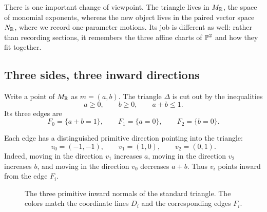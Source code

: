 There is one important change of viewpoint. The triangle lives in
\(M_{\mathbb{R}}\), the space of monomial exponents, whereas the new object
lives in the paired vector space \(N_{\mathbb{R}}\), where we record
one-parameter motions. Its job is different as well: rather than
recording sections, it remembers the three affine charts of
\(\mathbb{P}^2\) and how they fit together.

\subsection{Three sides, three inward directions}

Write a point of \(M_{\mathbb{R}}\) as \(m=(a,b)\). The triangle \(\Delta\)
is cut out by the inequalities
\[
a\geq0,\qquad b\geq0,\qquad a+b\leq1.
\]
Its three edges are
\[
F_0=\{a+b=1\},\qquad
F_1=\{a=0\},\qquad
F_2=\{b=0\}.
\]

Each edge has a distinguished primitive direction pointing into the
triangle:
\[
v_0=(-1,-1),\qquad
v_1=(1,0),\qquad
v_2=(0,1).
\]
Indeed, moving in the direction \(v_1\) increases \(a\), moving in the
direction \(v_2\) increases \(b\), and moving in the direction \(v_0\)
decreases \(a+b\). Thus \(v_i\) points inward from the edge \(F_i\).

\begin{figure}[ht]
\centering
{}
\caption{The three primitive inward normals of the standard triangle.
The colors match the coordinate lines \(D_i\) and the corresponding
edges \(F_i\).}
\label{fig:p2-inward-normals}
\end{figure}

